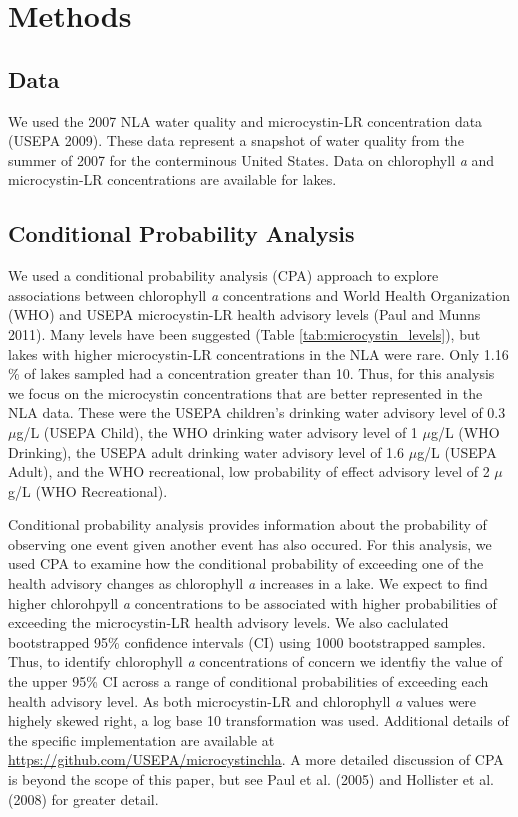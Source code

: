 \documentclass[11pt,]{article}
\begin{document}
\section{Methods}\label{methods}

\subsection{Data}\label{data}

We used the 2007 NLA water quality and microcystin-LR concentration data
(USEPA 2009). These data represent a snapshot of water quality from the
summer of 2007 for the conterminous United States. Data on chlorophyll
\emph{a} and microcystin-LR concentrations are available for lakes.

\subsection{Conditional Probability
Analysis}\label{conditional-probability-analysis}

We used a conditional probability analysis (CPA) approach to explore
associations between chlorophyll \emph{a} concentrations and World
Health Organization (WHO) and USEPA microcystin-LR health advisory
levels (Paul and Munns 2011). Many levels have been suggested (Table
\ref{tab:microcystin_levels}), but lakes with higher microcystin-LR
concentrations in the NLA were rare. Only 1.16 \% of lakes sampled had a
concentration greater than 10. Thus, for this analysis we focus on the
microcystin concentrations that are better represented in the NLA data.
These were the USEPA children's drinking water advisory level of 0.3
\(\mu\)g/L (USEPA Child), the WHO drinking water advisory level of 1
\(\mu\)g/L (WHO Drinking), the USEPA adult drinking water advisory level
of 1.6 \(\mu\)g/L (USEPA Adult), and the WHO recreational, low
probability of effect advisory level of 2 \(\mu\)g/L (WHO Recreational).

Conditional probability analysis provides information about the
probability of observing one event given another event has also occured.
For this analysis, we used CPA to examine how the conditional
probability of exceeding one of the health advisory changes as
chlorophyll \emph{a} increases in a lake. We expect to find higher
chlorohpyll \emph{a} concentrations to be associated with higher
probabilities of exceeding the microcystin-LR health advisory levels. We
also caclulated bootstrapped 95\% confidence intervals (CI) using 1000
bootstrapped samples. Thus, to identify chlorophyll \emph{a}
concentrations of concern we identfiy the value of the upper 95\% CI
across a range of conditional probabilities of exceeding each health
advisory level. As both microcystin-LR and chlorophyll \emph{a} values
were highely skewed right, a log base 10 transformation was used.
Additional details of the specific implementation are available at
\url{https://github.com/USEPA/microcystinchla}. A more detailed
discussion of CPA is beyond the scope of this paper, but see Paul et al.
(2005) and Hollister et al. (2008) for greater detail.
\end{document}
